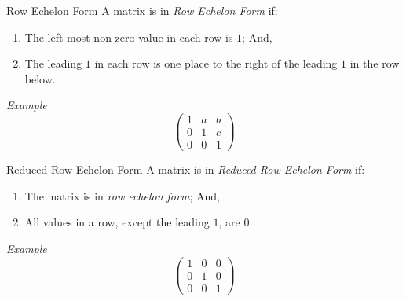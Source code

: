 \documentclass[11pt,a4paper]{article}
\begin{document}
\subtitle{Definition 3.20 - }{Row Echelon Form}
A matrix is in \textit{Row Echelon Form} if:
\begin{enumerate}[label=\roman*)]
  \item The left-most non-zero value in each row is $1$; And,
  \item The leading $1$ in each row is one place to the right of the leading $1$ in the row below.
\end{enumerate}
\textit{Example} $$\begin{pmatrix}
  1 & a & b \\
  0 & 1 & c \\
  0 & 0 & 1
\end{pmatrix}$$

\subtitle{Definition 3.20 - }{Reduced Row Echelon Form}
A matrix is in \textit{Reduced Row Echelon Form} if:
\begin{enumerate}[label=\roman*)]
  \item The matrix is in \textit{row echelon form}; And,
  \item All values in a row, except the leading $1$, are $0$.
\end{enumerate}
\textit{Example} $$\begin{pmatrix}
  1 & 0 & 0 \\
  0 & 1 & 0 \\
  0 & 0 & 1
\end{pmatrix}$$
\end{document}
